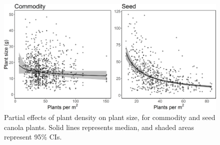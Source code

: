 \documentclass[12pt]{article} %
\begin{document}

\begin{figure} 
    \centering
    \includegraphics[width=\textwidth,keepaspectratio=true]{plDensPlSize_both.png}
    \caption[Partial effects of plant density on plant size]{Partial effects of plant density on plant size, for commodity and seed canola plants. Solid lines represents median, and shaded areas represent 95\% CIs.}
    \label{fig:plDensPlSize}
\end{figure}
\end{document}
